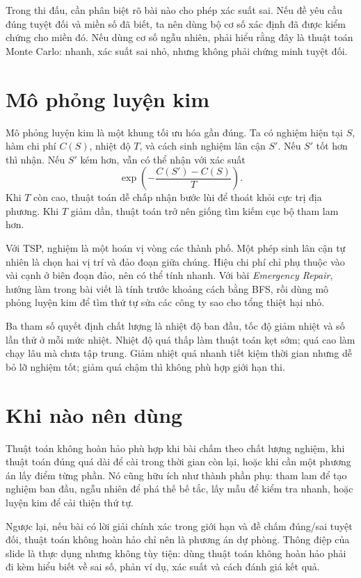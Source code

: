 \documentclass[11pt]{article}
\begin{document}
Trong thi đấu, cần phân biệt rõ bài nào cho phép xác suất sai. Nếu đề yêu cầu
đúng tuyệt đối và miền số đã biết, ta nên dùng bộ cơ số xác định đã được kiểm
chứng cho miền đó. Nếu dùng cơ số ngẫu nhiên, phải hiểu rằng đây là thuật
toán Monte Carlo: nhanh, xác suất sai nhỏ, nhưng không phải chứng minh tuyệt
đối.

\section{Mô phỏng luyện kim}

Mô phỏng luyện kim là một khung tối ưu hóa gần đúng. Ta có nghiệm hiện tại
\(S\), hàm chi phí \(C(S)\), nhiệt độ \(T\), và cách sinh nghiệm lân cận
\(S'\). Nếu \(S'\) tốt hơn thì nhận. Nếu \(S'\) kém hơn, vẫn có thể nhận với
xác suất
\[
  \exp\left(-\frac{C(S')-C(S)}{T}\right).
\]
Khi \(T\) còn cao, thuật toán dễ chấp nhận bước lùi để thoát khỏi cực trị địa
phương. Khi \(T\) giảm dần, thuật toán trở nên giống tìm kiếm cục bộ tham
lam hơn.

Với TSP, nghiệm là một hoán vị vòng các thành phố. Một phép sinh lân cận tự
nhiên là chọn hai vị trí và đảo đoạn giữa chúng. Hiệu chi phí chỉ phụ thuộc
vào vài cạnh ở biên đoạn đảo, nên có thể tính nhanh. Với bài \textit{Emergency
Repair}, hướng làm trong bài viết là tính trước khoảng cách bằng BFS, rồi dùng
mô phỏng luyện kim để tìm thứ tự sửa các công ty sao cho tổng thiệt hại nhỏ.

Ba tham số quyết định chất lượng là nhiệt độ ban đầu, tốc độ giảm nhiệt và số
lần thử ở mỗi mức nhiệt. Nhiệt độ quá thấp làm thuật toán kẹt sớm; quá cao
làm chạy lâu mà chưa tập trung. Giảm nhiệt quá nhanh tiết kiệm thời gian nhưng
dễ bỏ lỡ nghiệm tốt; giảm quá chậm thì không phù hợp giới hạn thi.

\section{Khi nào nên dùng}

Thuật toán không hoàn hảo phù hợp khi bài chấm theo chất lượng nghiệm, khi
thuật toán đúng quá dài để cài trong thời gian còn lại, hoặc khi cần một
phương án lấy điểm từng phần. Nó cũng hữu ích như thành phần phụ: tham lam để
tạo nghiệm ban đầu, ngẫu nhiên để phá thế bế tắc, lấy mẫu để kiểm tra nhanh,
hoặc luyện kim để cải thiện thứ tự.

Ngược lại, nếu bài có lời giải chính xác trong giới hạn và đề chấm đúng/sai
tuyệt đối, thuật toán không hoàn hảo chỉ nên là phương án dự phòng. Thông điệp
của slide là thực dụng nhưng không tùy tiện: dùng thuật toán không hoàn hảo
phải đi kèm hiểu biết về sai số, phản ví dụ, xác suất và cách đánh giá kết
quả.
\end{document}
